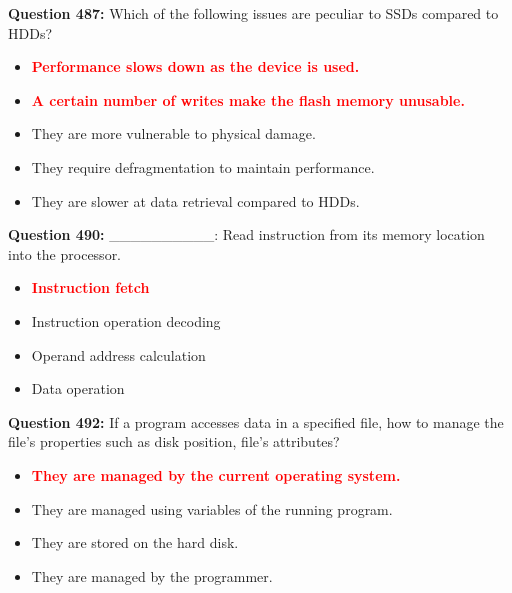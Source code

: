 \documentclass[12pt,a4paper]{article}
\begin{document}
\textbf{Question 487:} Which of the following issues are peculiar to SSDs compared to HDDs?

\begin{itemize}
    \item[\textbf{A.}] \textcolor{red}{\textbf{Performance slows down as the device is used.}}
    \item[\textbf{B.}] \textcolor{red}{\textbf{A certain number of writes make the flash memory unusable.}}
    \item[\textbf{C.}] They are more vulnerable to physical damage.
    \item[\textbf{D.}] They require defragmentation to maintain performance.
    \item[\textbf{E.}] They are slower at data retrieval compared to HDDs.
\end{itemize}

\vspace{0.5cm}

\textbf{Question 490:} __________: Read instruction from its memory location into the processor.

\begin{itemize}
    \item[\textbf{A.}] \textcolor{red}{\textbf{Instruction fetch}}
    \item[\textbf{B.}] Instruction operation decoding
    \item[\textbf{C.}] Operand address calculation
    \item[\textbf{D.}] Data operation
\end{itemize}

\vspace{0.5cm}

\textbf{Question 492:} If a program accesses data in a specified file, how to manage the file's properties such as disk position, file's attributes?

\begin{itemize}
    \item[\textbf{A.}] \textcolor{red}{\textbf{They are managed by the current operating system.}}
    \item[\textbf{B.}] They are managed using variables of the running program.
    \item[\textbf{C.}] They are stored on the hard disk.
    \item[\textbf{D.}] They are managed by the programmer.
\end{itemize}

\vspace{0.5cm}
\end{document}
